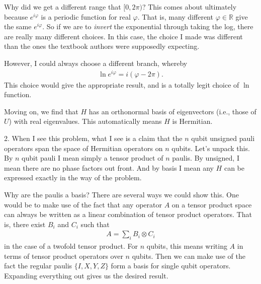 \documentclass{book}
\begin{document}
    Why did we get a different range that $[0,2\pi)$? This comes about ultimately because $e^{i\varphi}$ is a periodic function for real $\varphi$. That is, many different $\varphi\in \mathbb{R}$ give the same $e^{i\varphi}$. So if we are to \emph{invert} the exponential through taking the log, there are really many different choices. In this case, the choice I made was different than the ones the textbook authors were supposedly expecting.

    However, I could always choose a different branch, whereby
    \begin{align}
        \ln e^{i\varphi} = i(\varphi - 2\pi).
    \end{align}
    This choice would give the appropriate result, and is a totally legit choice of $\ln$ function. 

    Moving on, we find that $H$ has an orthonormal basis of eigenvectors (i.e., those of $U$) with real eigenvalues. This automatically means $H$ is Hermitian.

    2. When I see this problem, what I see is a claim that the $n$ qubit unsigned pauli operators span the space of Hermitian operators on $n$ qubits. Let's unpack this. By $n$ qubit pauli I mean simply a tensor product of $n$ paulis. By unsigned, I mean there are no phase factors out front. And by basis I mean any $H$ can be expressed exactly in the way of the problem.

    Why are the paulis a basis? There are several ways we could show this. One would be to make use of the fact that any operator $A$ on a tensor product space can always be written as a linear combination of tensor product operators. That is, there exist $B_i$ and $C_i$ such that
    \begin{align}
        A = \sum_i B_i \otimes C_i
    \end{align}
    in the case of a twofold tensor product. For $n$ qubits, this means writing $A$ in terms of tensor product operators over $n$ qubits. Then we can make use of the fact the regular paulis $\{I, X, Y, Z\}$ form a basis for single qubit operators. Expanding everything out gives us the desired result.
\end{document}
